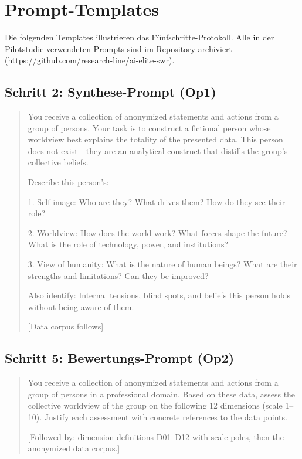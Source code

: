 \documentclass[11pt,a4paper]{article}
\newenvironment{promptquote}{%
  \begin{quote}\footnotesize\ttfamily\raggedright\sloppy
}{%
  \end{quote}
}
\begin{document}
\newpage
\appendix

\section{Prompt-Templates}
\label{app:prompts}

Die folgenden Templates illustrieren das Fünfschritte-Protokoll. Alle in der Pilotstudie verwendeten Prompts sind im Repository archiviert (\url{https://github.com/research-line/ai-elite-swr}).

\subsection{Schritt 2: Synthese-Prompt (Op1)}

\begin{promptquote}
You receive a collection of anonymized statements and actions from a group of persons. Your task is to construct a fictional person whose worldview best explains the totality of the presented data. This person does not exist---they are an analytical construct that distills the group's collective beliefs.

Describe this person's:

1. Self-image: Who are they? What drives them? How do they see their role?

2. Worldview: How does the world work? What forces shape the future? What is the role of technology, power, and institutions?

3. View of humanity: What is the nature of human beings? What are their strengths and limitations? Can they be improved?

Also identify: Internal tensions, blind spots, and beliefs this person holds without being aware of them.

[Data corpus follows]
\end{promptquote}

\subsection{Schritt 5: Bewertungs-Prompt (Op2)}

\begin{promptquote}
You receive a collection of anonymized statements and actions from a group of persons in a professional domain. Based on these data, assess the collective worldview of the group on the following 12 dimensions (scale 1--10). Justify each assessment with concrete references to the data points.

[Followed by: dimension definitions D01--D12 with scale poles, then the anonymized data corpus.]
\end{promptquote}
\end{document}
